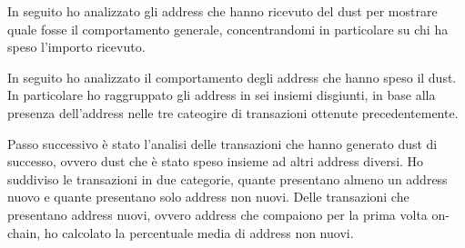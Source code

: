 In seguito ho analizzato gli address che hanno ricevuto del dust per mostrare quale fosse il comportamento generale, concentrandomi in particolare su chi ha speso l'importo ricevuto.

In seguito ho analizzato il comportamento degli address che hanno speso il dust. In particolare ho raggruppato gli address in sei insiemi disgiunti, in base alla presenza dell'address nelle tre cateogire di transazioni ottenute precedentemente.

Passo successivo è stato l'analisi delle transazioni che hanno generato dust di successo, ovvero dust che è stato speso insieme ad altri address diversi. Ho suddiviso le transazioni in due categorie, quante presentano almeno un address nuovo e quante presentano solo address non nuovi. Delle transazioni che presentano address nuovi, ovvero address che compaiono per la prima volta on-chain, ho calcolato la percentuale media di address non nuovi.


